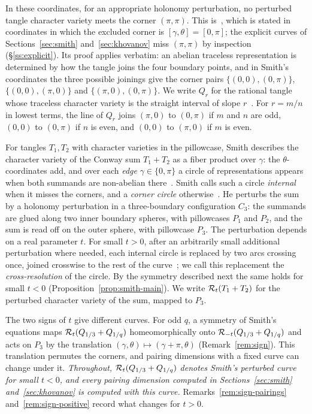 In these coordinates, for an appropriate holonomy perturbation, no perturbed tangle character variety meets the
corner $(\pi,\pi)$. This is~\cite[Prop.~11.1]{CHKK}, which is stated in coordinates in which the excluded corner is
$[\gamma,\theta]=[0,\pi]$; the explicit curves of Sections~\ref{sec:smith} and~\ref{sec:khovanov} miss $(\pi,\pi)$
by inspection (\S\ref{ss:explicit}). Its proof applies verbatim: an abelian traceless representation is determined by how
the tangle joins the four boundary points, and in Smith's coordinates the three possible joinings give the corner
pairs $\{(0,0),(0,\pi)\}$, $\{(0,0),(\pi,0)\}$ and $\{(\pi,0),(0,\pi)\}$. We write $Q_r$ for the rational tangle
whose traceless character variety is the straight interval of slope $r$~\cite[Prop.~2.27]{Smith}. For $r=m/n$ in
lowest terms, the line of $Q_r$ joins $(\pi,0)$ to $(0,\pi)$ if $m$ and $n$ are odd, $(0,0)$ to $(0,\pi)$ if $n$ is
even, and $(0,0)$ to $(\pi,0)$ if $m$ is even.

For tangles $T_1,T_2$ with character varieties in the pillowcase, Smith describes the character variety of the
Conway sum $T_1+T_2$ as a fiber product over $\gamma$: the $\theta$-coordinates add, and over each \emph{edge}
$\gamma\in\{0,\pi\}$ a circle of representations appears when both summands are non-abelian
there~\cite[Thms.~3.15 and~3.26]{Smith}. Smith calls such a circle \emph{internal} when it misses the
corners, and a \emph{corner circle} otherwise~\cite[Def.~3.24]{Smith}. He perturbs the sum by a holonomy
perturbation in a three-boundary configuration $C_3$: the summands are glued along two inner boundary spheres,
with pillowcases $P_1$ and $P_2$, and the sum is read off on the outer sphere, with pillowcase $P_3$. The
perturbation depends on a real parameter $t$. For small $t>0$, after an arbitrarily small additional
perturbation where needed, each internal circle is replaced by two arcs crossing once, joined crosswise to the
rest of the curve~\cite[Thm.~4.22; the crossing is drawn in Figs.~3b and~23c]{Smith}; we call this replacement the \emph{cross-resolution} of
the circle. By the symmetry described next the same holds for small $t<0$ (Proposition~\ref{prop:smith-main}).
We write $\mathcal{R}_t(T_1+T_2)$ for the perturbed character variety of the sum, mapped to $P_3$.

The two signs of $t$ give different curves. For odd $q$, a symmetry of Smith's equations maps
$\mathcal{R}_t(Q_{1/3}+Q_{1/q})$ homeomorphically onto $\mathcal{R}_{-t}(Q_{1/3}+Q_{1/q})$ and acts on $P_3$ by the
translation $(\gamma,\theta)\mapsto(\gamma+\pi,\theta)$ (Remark~\ref{rem:sign}). This translation permutes
the corners, and pairing dimensions with a fixed curve can change under it.
\emph{Throughout, $\mathcal{R}_t(Q_{1/3}+Q_{1/q})$ denotes Smith's perturbed curve for small $t<0$, and every pairing
dimension computed in Sections~\ref{sec:smith} and~\ref{sec:khovanov} is computed with this curve.}
Remarks~\ref{rem:sign-pairings} and~\ref{rem:sign-positive} record what changes for $t>0$.

